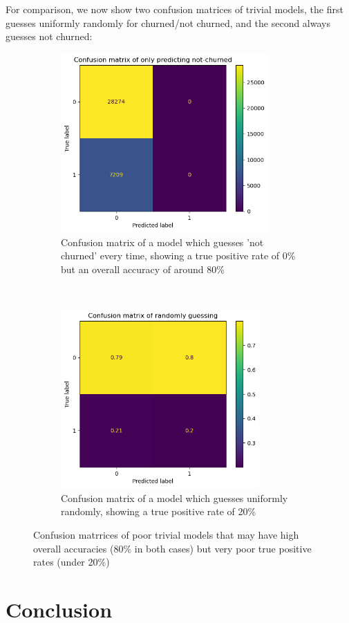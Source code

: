 \documentclass[]{article}
\begin{document}
For comparison, we now show two confusion matrices of trivial models, the first guesses uniformly randomly for churned/not churned, and the second always guesses not churned:

\begin{figure}[h!]
	\centering
	\begin{subfigure}[t]{0.55\textwidth}
		\centering
		\includegraphics[height=2.7in]{trivial_0}
		\caption{Confusion matrix of a model which guesses 'not churned' every time, showing a true positive rate of 0\% but an overall accuracy of around 80\%}
	\end{subfigure}%
	~
	\begin{subfigure}[t]{0.55\textwidth}
		\centering
		\includegraphics[height=2.7in]{trivial_guesser}
		\caption{Confusion matrix of a model which guesses uniformly randomly, showing a true positive rate of 20\%}
	\end{subfigure}
	\caption{Confusion matrrices of poor trivial models that may have high overall accuracies (80\% in both cases) but very poor true positive rates (under 20\%)}
\end{figure}

\section{Conclusion}
\end{document}
